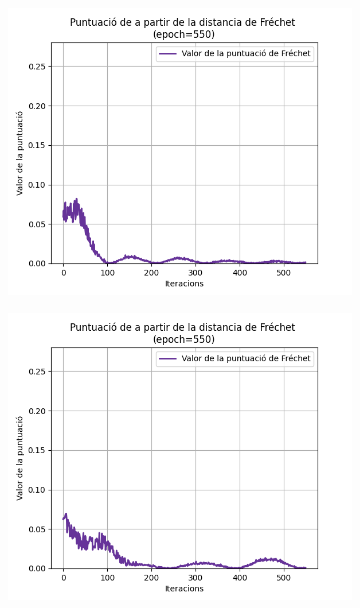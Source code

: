 \begin{figure}[H]
	\begin{subfigure}[b]{.32\linewidth}
		\includegraphics[width=\linewidth]{figures/data/FD_score_1.png}
		\caption{}
	\end{subfigure}
	\begin{subfigure}[b]{.32\linewidth}
		\includegraphics[width=\linewidth]{figures/data/FD_score_2.png}
		\caption{}
	\end{subfigure}
	\begin{subfigure}[b]{.32\linewidth}

\end{subfigure}
\end{figure}
